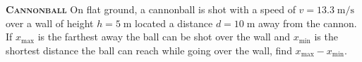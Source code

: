 \begin{problem}
{\textbf{\textsc{Cannonball}}} On flat ground, a cannonball is shot with a speed of $v=13.3\;\mathrm{m/s}$ over a wall of height $h=5\;\mathrm{m}$ located a distance $d=10\;\mathrm{m}$ away from the cannon. If $x_{\max}$ is the farthest away the ball can be shot over the wall and $x_{\min}$ is the shortest distance the ball can reach while going over the wall, find $x_{\max}-x_{\min}$.

\end{problem}